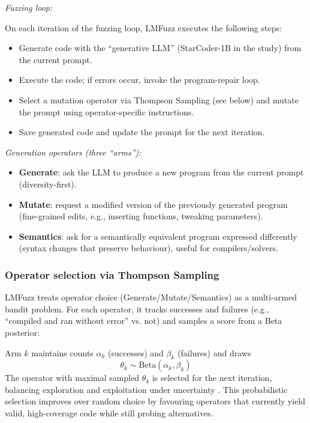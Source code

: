 \lilspace
\textit{Fuzzing loop:}

On each iteration of the fuzzing loop, LMFuzz executes the following steps:

\begin{itemize}
    \item Generate code with the ``generative LLM'' (StarCoder-1B in the study) from the current prompt.
    \item Execute the code; if errors occur, invoke the program-repair loop.
    \item Select a mutation operator via Thompson Sampling (see below) and mutate the prompt using operator-specific instructions.
    \item Save generated code and update the prompt for the next iteration.
\end{itemize}

\lilspace
\textit{Generation operators (three ``arms''):}

\begin{itemize}
    \item \textbf{Generate}: ask the LLM to produce a new program from the current prompt (diversity-first).
    \item \textbf{Mutate}: request a modified version of the previously generated program (fine-grained edits, e.g., inserting functions, tweaking parameters).
    \item \textbf{Semantics}: ask for a semantically equivalent program expressed differently (syntax changes that preserve behaviour), useful for compilers/solvers.
\end{itemize}

\subsubsection{Operator selection via Thompson Sampling}

LMFuzz treats operator choice (Generate/Mutate/Semantics) as a multi-armed bandit problem. For each operator, it tracks successes and failures (e.g., ``compiled and ran without error'' vs. not) and samples a score from a Beta posterior:

Arm $k$ maintains counts $\alpha_k$ (successes) and $\beta_k$ (failures) and draws
\[
\theta_k \sim \mathrm{Beta}(\alpha_k, \beta_k)
\]
The operator with maximal sampled $\theta_k$ is selected for the next iteration, balancing exploration and exploitation under uncertainty \cite{thompson_1933_on}. This probabilistic selection improves over random choice by favouring operators that currently yield valid, high-coverage code while still probing alternatives.

